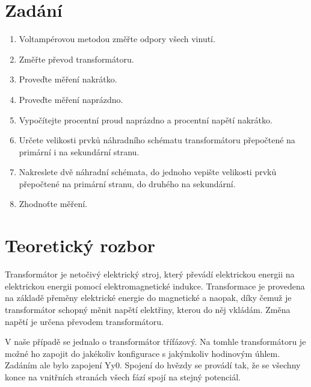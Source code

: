 \documentclass{protokol}
\begin{document}
\maketitle

\section{Zadání}
\begin{enumerate}
    \item Voltampérovou metodou změřte odpory všech vinutí.
    \item Změřte převod transformátoru.
    \item Proveďte měření nakrátko.
    \item Proveďte měření naprázdno.
    \item Vypočítejte procentní proud naprázdno a procentní napětí nakrátko.
    \item Určete velikosti prvků náhradního schématu transformátoru přepočtené na primární i na sekundární stranu.
    \item Nakreslete dvě náhradní schémata, do jednoho vepište velikosti prvků přepočtené na primární stranu, do druhého na sekundární.
    \item Zhodnoťte měření.
\end{enumerate}

\section{Teoretický rozbor}
Transformátor je netočivý elektrický stroj, který převádí elektrickou energii na elektrickou energii pomocí elektromagnetické indukce. Transformace je provedena na základě přeměny elektrické energie do magnetické a naopak, díky čemuž je transformátor schopný měnit napětí elektřiny, kterou do něj vkládám. Změna napětí je určena převodem transformátoru. 

V naše případě se jednalo o transformátor třífázový. Na tomhle transformátoru je možné ho zapojit do jakékoliv konfigurace s jakýmkoliv hodinovým úhlem. Zadáním ale bylo zapojení Yy0. Spojení do hvězdy se provádí tak, že se všechny konce na vnitřních stranách všech fází spojí na stejný potenciál.
\end{document}
